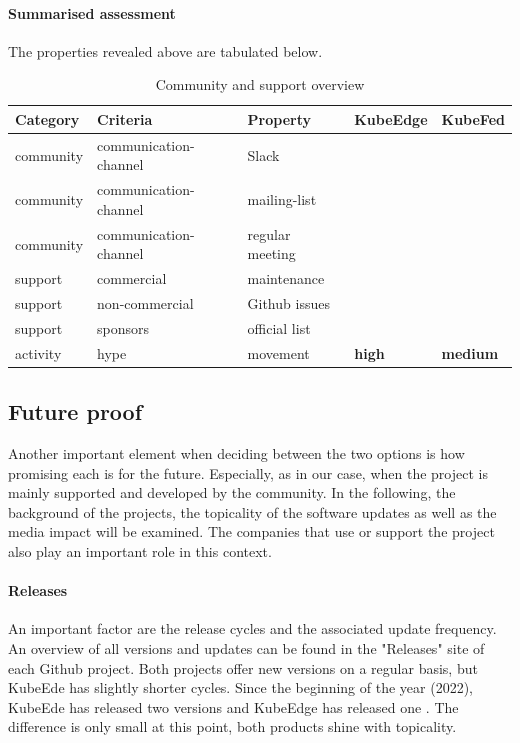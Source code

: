 \documentclass[MSC,Master,english]{twbook}%
\newcommand{\cmark}{\ding{51}}%
\newcommand{\xmark}{\ding{55}}%
\begin{document}
\paragraph{Summarised assessment} The properties revealed above are tabulated below.  
\begin{table}[ht]
    \begin{center}
        \begin{tabular}{|l|l|l|l|l|}
            \hline
            Category & Criteria & Property & \textbf{KubeEdge} & \textbf{KubeFed} \\
            \hline
            community & communication-channel  & Slack & \cmark & \cmark \\
            community & communication-channel  & mailing-list & \cmark & \cmark \\
            community & communication-channel & regular meeting & \cmark & \cmark \\
            support & commercial & maintenance & \xmark & \xmark \\
            support & non-commercial & Github issues & \cmark & \cmark \\
            support & sponsors & official list & \cmark & \xmark \\
            activity & hype & movement & \textbf{high} & \textbf{medium} \\
            \hline
        \end{tabular}
        \caption{Community and support overview}
        \label{tab:cs-overview}
    \end{center}
\end{table}

\subsection{Future proof}
Another important element when deciding between the two options is how promising each is for the future. Especially, as in our case, when the project is mainly supported and developed by the community. In the following, the background of the projects, the topicality of the software updates as well as the media impact will be examined. The companies that use or support the project also play an important role in this context.

\paragraph{Releases} An important factor are the release cycles and the associated update frequency. An overview of all versions and updates can be found in the "Releases" site of each Github project. Both projects offer new versions on a regular basis, but KubeEde has slightly shorter cycles. Since the beginning of the year (2022), KubeEde has released two versions and KubeEdge has released one \cite{ke-releases-gh}\cite{kf-releases-gh}. The difference is only small at this point, both products shine with topicality.
\end{document}
